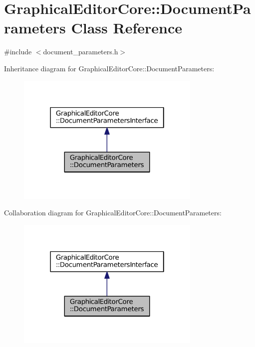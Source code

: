 \hypertarget{classGraphicalEditorCore_1_1DocumentParameters}{}\section{Graphical\+Editor\+Core\+:\+:Document\+Parameters Class Reference}
\label{classGraphicalEditorCore_1_1DocumentParameters}


{\ttfamily \#include $<$document\+\_\+parameters.\+h$>$}



Inheritance diagram for Graphical\+Editor\+Core\+:\+:Document\+Parameters\+:
\nopagebreak
\begin{figure}[H]
\begin{center}
\leavevmode
\includegraphics[width=250pt]{classGraphicalEditorCore_1_1DocumentParameters__inherit__graph}
\end{center}
\end{figure}


Collaboration diagram for Graphical\+Editor\+Core\+:\+:Document\+Parameters\+:
\nopagebreak
\begin{figure}[H]
\begin{center}
\leavevmode
\includegraphics[width=250pt]{classGraphicalEditorCore_1_1DocumentParameters__coll__graph}
\end{center}
\end{figure}
